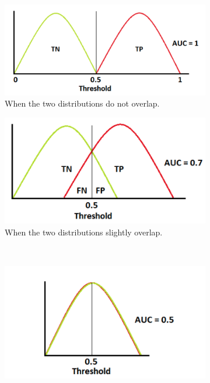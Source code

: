 \begin{figure}[H]
	\centering
	\begin{subfigure}{0.48\linewidth}
		\vspace{0.3cm}
		\includegraphics[width=\linewidth]{Materials/Theory/ROC1}
		\caption{When the two distributions do not overlap.}
	\end{subfigure}
	\hfill
	\begin{subfigure}{0.48\linewidth}
		\centering
		\includegraphics[width=\linewidth]{Materials/Theory/ROC2}
		\caption{When the two distributions slightly overlap.}
	\end{subfigure}
	\\
	\begin{subfigure}{0.48\linewidth}
		\centering
		\includegraphics[width=\linewidth]{Materials/Theory/ROC3}

\end{subfigure}
\end{figure}
